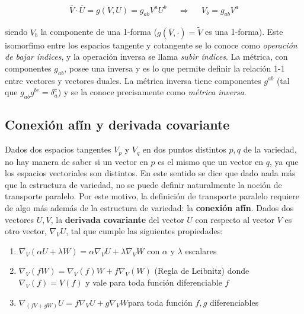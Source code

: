 \begin{align*}
    \overline{V}\cdot \overline{U}=g(V,U)=g_{ab}V^aU^b& &\Longrightarrow& &V_b=g_{ab}V^a
\end{align*}
    
siendo $V_b$ la componente de una 1-forma ($g(\overline{V},\cdot)=\widetilde{V}$ es una 1-forma). Este isomorfimo entre los espacios tangente y cotangente se lo conoce como \textit{operación de bajar índices}, y la operación inversa se llama \textit{subir índices}. La métrica, con componentes $g_{ab}$, posee una inversa y es lo que permite definir la relación 1-1 entre vectores y vectores duales. La métrica inversa tiene componentes $g^{ab}$ (tal que $g_{ab}g^{bc}=\delta_a^c$)  y se la conoce precisamente como \textit{métrica inversa}.






\subsection{Conexión afín y derivada covariante}  



Dados dos espacios tangentes $V_p$ y $V_q$ en dos puntos distintos $p,q$ de la variedad, no hay manera de saber si un vector en $p$ es el mismo que un vector en $q$, ya que los espacios vectoriales son distintos. En este sentido se dice que dado nada más que la estructura de variedad, no se puede definir naturalmente la noción de transporte paralelo. Por este motivo, la definición de transporte paralelo requiere de algo más además de la estructura de variedad: la \textbf{conexión afín}. Dados dos vectores $U,V$, la \textbf{derivada covariante} del vector $U$ con respecto al vector $V$ es otro vector, $\nabla_VU$, tal que cumple las siguientes propiedades:

\begin{enumerate}[{1)}]
    \item $\nabla_V(\alpha U+\lambda W)=\alpha\nabla_VU+\lambda\nabla_VW$ \quad con $\alpha$ y $\lambda$ escalares
    \item $\nabla_V(fW)=\nabla_V(f)W+f\nabla_V(W)$ (Regla de Leibnitz) \quad donde $\nabla_V(f)=V(f)$ y vale para toda función diferenciable $f$
    \item $\nabla_{(fV+gW)}U=f\nabla_VU+g\nabla_VW$\quad para toda función $f,g$ diferenciables
\end{enumerate}

